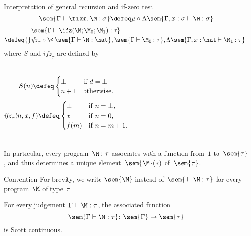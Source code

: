 \begin{frame}{Interpretation of general recursion and if-zero test}
  \[
    \sem{\Gamma \vdash \fix x.\, \M : \sigma} \defeq
    \mu \circ \Lambda\sem{\Gamma, x : \sigma \vdash \M : \sigma}
  \]
  \begin{align*}
    & \sem{\Gamma \vdash \ifz(\M; \M_0; \M_1) : \tau} \\
    \defeq{} & \mathit{ifz}_\tau \circ \<\,
    \sem{\Gamma \vdash \M  : \nat},
    \sem{\Gamma \vdash \M_0 : \tau},
    \Lambda\sem{\Gamma, x : \nat \vdash \M_1 : \tau}\,\>
  \end{align*}
  where $S$ and $\mathit{ifz}_\tau$ are defined by
  \begin{columns}
      \[
        S(n) \defeq
        \begin{cases}
          \bot & \text{if $d = \bot$} \\
          n + 1 & \text{otherwise.}
        \end{cases}
      \]
      \[
        \mathit{ifz}_\tau(n, x, f) \defeq
        \begin{cases}
          \bot & \text{if $n = \bot$,} \\
          x   & \text{if $n = 0$,} \\
          f(m) & \text{if $n = m +1$.} \\
        \end{cases}
      \]
  \end{columns}
\end{frame}

\begin{frame}
  In particular, every program~$\M:\tau$ associates with a function from~$1$
  to~$\sem{\tau}$, and thus determines a unique element~$\sem{\M}(*)$
  of~$\sem{\tau}$. 
  \begin{block}{Convention}
    For brevity, we write $\sem{\M}$ instead of~$\sem{{}\vdash\M : \tau}$ for
    every program~$\M$ of type~$\tau$
  \end{block}
  \begin{theorem}
    For every judgement~$\Gamma \vdash \M:\tau$, 
    the associated function
    \[
      \sem{\Gamma \vdash \M : \tau} \colon \sem{\Gamma} \to \sem{\tau}
    \]
    is Scott continuous. 
  \end{theorem}
\end{frame}


